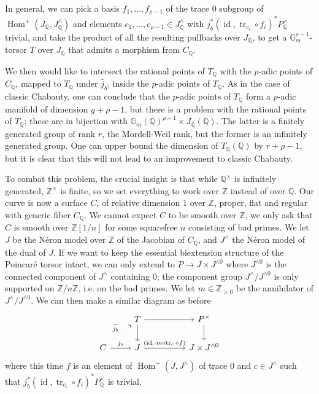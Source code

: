 \documentclass[12pt]{article}
\newcommand{\Z}{\mathbb{Z}}
\renewcommand{\G}{\mathbb{G}}
\newcommand{\Q}{\mathbb{Q}}
\DeclareMathOperator{\Hom}{Hom}
\DeclareMathOperator{\id}{id}
\DeclareMathOperator{\tr}{tr}
\theoremstyle{plain}
\theoremstyle{definition}
\theoremstyle{remark}
\begin{document}
In general, we can pick a basis $f_1,\dots,f_{\rho-1}$ of the trace $0$ subgroup of $\Hom^+(J_\Q,J^\wedge_\Q)$ and elements $c_1,\dots,c_{\rho-1} \in J_\Q^\wedge$ with $j_b^* (\id,\tr_{c_i} \circ f_i)^* P_{\Q}^\times$ trivial, and take the product of all the resulting pullbacks over $J_\Q$, to get a $\G_m^{\rho-1}$-torsor $T$ over $J_\Q$ that admits a morphism from $C_\Q$.

We then would like to intersect the rational points of $T_\Q$ with the $p$-adic points of $C_\Q$, mapped to $T_\Q$ under $\widetilde{j_b}$, inside the $p$-adic points of $T_\Q$. As in the case of classic Chabauty, one can conclude that the $p$-adic points of $T_\Q$ form a $p$-adic manifold of dimension $g+\rho-1$, but there is a problem with the rational points of $T_\Q$; these are in bijection with $\G_m(\Q)^{\rho-1} \times J_\Q(\Q)$. The latter is a finitely generated group of rank $r$, the Mordell-Weil rank, but the former is an infinitely generated group. One can upper bound the dimension of $\overline{T_\Q(\Q)}$ by $r + \rho -1$, but it is clear that this will not lead to an improvement to classic Chabauty.

To combat this problem, the crucial insight is that while $\Q^\times$ is infinitely generated, $\Z^\times$ is finite, so we set everything to work over $\Z$ instead of over $\Q$. Our curve is now a surface $C$, of relative dimension $1$ over $\Z$, proper, flat and regular with generic fiber $C_\Q$. We cannot expect $C$ to be smooth over $\Z$, we only ask that $C$ is smooth over $\Z[1/n]$ for some squarefree $n$ consisting of bad primes. We let $J$ be the N\'eron model over $\Z$ of the Jacobian of $C_\Q$, and $J^\wedge$ the N\'eron model of the dual of $J$. If we want to keep the essential biextension structure of the Poincar\'e torsor intact, we can only extend to $P \to J \times J^{\wedge 0}$ where $J^{\wedge 0}$ is the connected component of $J^\wedge$ containing $0$; the component group $J^\wedge/J^{\wedge 0}$ is only supported on $\Z/n\Z$, i.e. on the bad primes. We let $m\in \Z_{>0}$ be the annihilator of $J^\wedge/J^{\wedge 0}$. We can then make a similar diagram as before
\[\begin{tikzcd} %
                                                & T \arrow[d] \arrow[rr]                   && P^\times \arrow[d]      \\
C \arrow[ru, "\widetilde{j_b}", dotted] \arrow[r, "j_b"] & J \arrow[rr, "{(\id,\cdot m \circ\tr_c \circ f)}"] && J \times J^{\wedge 0}
\end{tikzcd}\]
where this time $f$ is an element of $\Hom^+(J,J^\wedge)$ of trace $0$ and $c \in J^{\wedge}$ such that $j_b^* (\id,\tr_{c_i} \circ f_i)^* P_{\Q}^\times$ is trivial.
\end{document}
